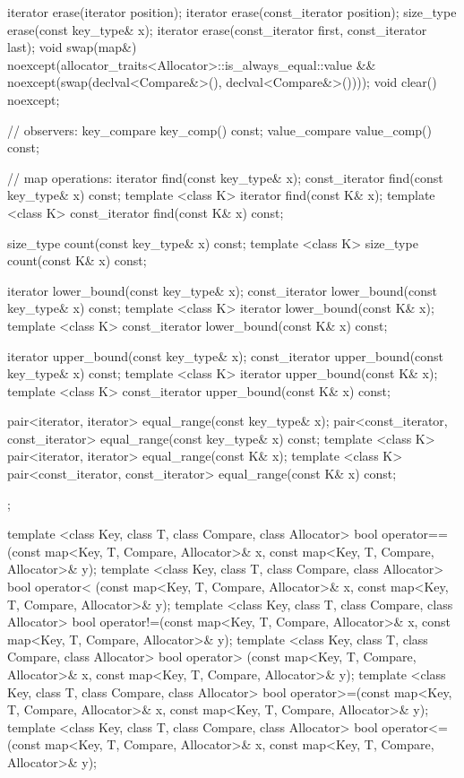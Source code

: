 \begin{codeblock}
{{    iterator  erase(iterator position);
    iterator  erase(const_iterator position);
    size_type erase(const key_type& x);
    iterator  erase(const_iterator first, const_iterator last);
    void      swap(map&)
      noexcept(allocator_traits<Allocator>::is_always_equal::value &&
               noexcept(swap(declval<Compare&>(), declval<Compare&>())));
    void      clear() noexcept;

    // observers:
    key_compare key_comp() const;
    value_compare value_comp() const;

    // map operations:
    iterator       find(const key_type& x);
    const_iterator find(const key_type& x) const;
    template <class K> iterator       find(const K& x);
    template <class K> const_iterator find(const K& x) const;

    size_type      count(const key_type& x) const;
    template <class K> size_type count(const K& x) const;

    iterator       lower_bound(const key_type& x);
    const_iterator lower_bound(const key_type& x) const;
    template <class K> iterator       lower_bound(const K& x);
    template <class K> const_iterator lower_bound(const K& x) const;

    iterator       upper_bound(const key_type& x);
    const_iterator upper_bound(const key_type& x) const;
    template <class K> iterator       upper_bound(const K& x);
    template <class K> const_iterator upper_bound(const K& x) const;

    pair<iterator, iterator>               equal_range(const key_type& x);
    pair<const_iterator, const_iterator>   equal_range(const key_type& x) const;
    template <class K>
      pair<iterator, iterator>             equal_range(const K& x);
    template <class K>
      pair<const_iterator, const_iterator> equal_range(const K& x) const;
  };

  template <class Key, class T, class Compare, class Allocator>
    bool operator==(const map<Key, T, Compare, Allocator>& x,
                    const map<Key, T, Compare, Allocator>& y);
  template <class Key, class T, class Compare, class Allocator>
    bool operator< (const map<Key, T, Compare, Allocator>& x,
                    const map<Key, T, Compare, Allocator>& y);
  template <class Key, class T, class Compare, class Allocator>
    bool operator!=(const map<Key, T, Compare, Allocator>& x,
                    const map<Key, T, Compare, Allocator>& y);
  template <class Key, class T, class Compare, class Allocator>
    bool operator> (const map<Key, T, Compare, Allocator>& x,
                    const map<Key, T, Compare, Allocator>& y);
  template <class Key, class T, class Compare, class Allocator>
    bool operator>=(const map<Key, T, Compare, Allocator>& x,
                    const map<Key, T, Compare, Allocator>& y);
  template <class Key, class T, class Compare, class Allocator>
    bool operator<=(const map<Key, T, Compare, Allocator>& x,
                    const map<Key, T, Compare, Allocator>& y);

}
\end{codeblock}

